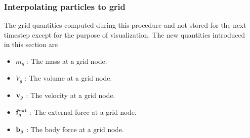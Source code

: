 \subsubsection{Interpolating particles to grid}
The grid quantities computed during this procedure and not stored for the next timestep except for
the purpose of visualization.  The new quantities introduced in this section are
\begin{itemize} 
  \setlength\itemsep{1pt}
  \item $m_g$ : {\Ochre The mass at a grid node.}
  \item $V_g$ : {\Ochre The volume at a grid node.}
  \item $\mathbf{v}_g$ : {\Ochre The velocity at a grid node.}
  \item $\mathbf{f}^{\text{ext}}_g$ : {\Ochre The external force at a grid node.}
  \item $\mathbf{b}_g$ : {\Ochre The body force at a grid node.}
\end{itemize}
